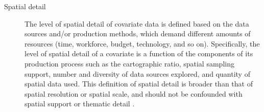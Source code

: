 


\begin{description}
 \item [Spatial detail] The level of spatial detail of covariate data is defined based on the data 
 sources and/or production methods, which demand different amounts of resources (time, workforce, 
 budget, technology, and so on). Specifically, the level of spatial detail of a covariate is a 
 function of the components of its production process such as the cartographic ratio, spatial 
 sampling support, number and diversity of data sources explored, and quantity of spatial data used. 
 This definition of spatial detail is broader than that of spatial resolution or spatial scale, and 
 should not be confounded with spatial support \cite{WebsterEtAl2007} or thematic detail 
 \cite{Rossiter2000}.
\end{description}